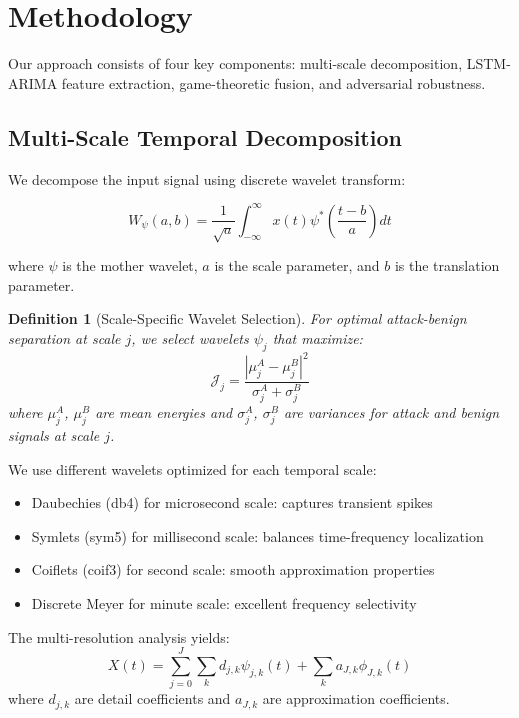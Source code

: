 \documentclass[10pt,conference]{IEEEtran}
\newtheorem{definition}[theorem]{Definition}
\begin{document}
\section{Methodology}

Our approach consists of four key components: multi-scale decomposition, LSTM-ARIMA feature extraction, game-theoretic fusion, and adversarial robustness.

\subsection{Multi-Scale Temporal Decomposition}

We decompose the input signal using discrete wavelet transform:

\begin{equation}
W_{\psi}(a,b) = \frac{1}{\sqrt{a}} \int_{-\infty}^{\infty} x(t) \psi^*\left(\frac{t-b}{a}\right) dt
\end{equation}

where $\psi$ is the mother wavelet, $a$ is the scale parameter, and $b$ is the translation parameter.

\begin{definition}[Scale-Specific Wavelet Selection]
For optimal attack-benign separation at scale $j$, we select wavelets $\psi_j$ that maximize:
\begin{equation}
\mathcal{J}_j = \frac{|\mu_j^A - \mu_j^B|^2}{\sigma_j^A + \sigma_j^B}
\end{equation}
where $\mu_j^A$, $\mu_j^B$ are mean energies and $\sigma_j^A$, $\sigma_j^B$ are variances for attack and benign signals at scale $j$.
\end{definition}

We use different wavelets optimized for each temporal scale:
\begin{itemize}
    \item Daubechies (db4) for microsecond scale: captures transient spikes
    \item Symlets (sym5) for millisecond scale: balances time-frequency localization
    \item Coiflets (coif3) for second scale: smooth approximation properties
    \item Discrete Meyer for minute scale: excellent frequency selectivity
\end{itemize}

The multi-resolution analysis yields:
\begin{equation}
X(t) = \sum_{j=0}^{J} \sum_{k} d_{j,k} \psi_{j,k}(t) + \sum_{k} a_{J,k} \phi_{J,k}(t)
\end{equation}
where $d_{j,k}$ are detail coefficients and $a_{J,k}$ are approximation coefficients.
\end{document}
